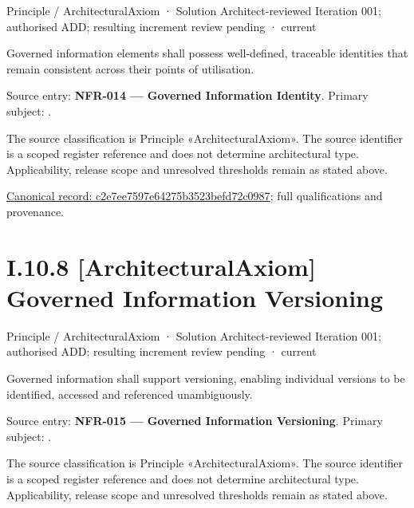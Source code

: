 \label{element:c2e7ee7597e64275b3523befd72c0987}
{\small Principle / ArchitecturalAxiom · Solution Architect-reviewed Iteration 001; authorised ADD; resulting increment review pending · current}\par

Governed information elements shall possess well-defined, traceable identities that remain consistent across their points of utilisation.



Source entry: \textbf{NFR-014 — Governed Information Identity}. Primary subject: \texttt{}.



The source classification is Principle «ArchitecturalAxiom». The source identifier is a scoped register reference and does not determine architectural type. Applicability, release scope and unresolved thresholds remain as stated above.


{\footnotesize \href{../../../../../../../continuum/motivation/principle/architectural-axiom/c2e7ee7597e64275b3523befd72c0987.md}{Canonical record: c2e7ee7597e64275b3523befd72c0987}; full qualifications and provenance.}\par
\section*{I.10.8 [ArchitecturalAxiom] Governed Information Versioning}
\label{navigation:I.10.8}

\label{element:2bd0132f072b42e9bf71bf483eb2deec}
{\small Principle / ArchitecturalAxiom · Solution Architect-reviewed Iteration 001; authorised ADD; resulting increment review pending · current}\par

Governed information shall support versioning, enabling individual versions to be identified, accessed and referenced unambiguously.



Source entry: \textbf{NFR-015 — Governed Information Versioning}. Primary subject: \texttt{}.



The source classification is Principle «ArchitecturalAxiom». The source identifier is a scoped register reference and does not determine architectural type. Applicability, release scope and unresolved thresholds remain as stated above.


